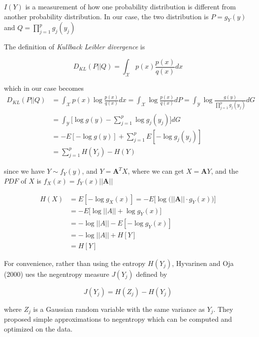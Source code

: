 \documentclass{article}
\begin{document}
\begin{tcolorbox}[title=\textit{Kullback  Leibler divergence}, coltitle = blue!50!black, colframe = blue!25]
	$I(Y)$ is a measurement of how one probability distribution is different from another probability distribution. In our case, the two distribution is $P = g_Y(y)$ and $Q = \prod_{j=1}^p g_j(y_j)$
	
	The definition of \textit{Kullback  Leibler divergence} is

	\begin{equation}
		D_{KL}(P||Q) = \int_{\mathcal X} p(x) \frac{p(x)}{q(x)} dx
	\end{equation}
	
	which in our case becomes
	\begin{align}
		D_{KL}(P||Q) &= \int_{\mathcal X} p(x) \log \frac{p(x)}{q(x)} dx
		 = \int_{\mathcal X} \log \frac{p(x)}{q(x)} dP
		  = \int_{\mathcal Y} \log \frac{g(y)}{\prod_{j=1}^p g_j(y_j)} dG\\
		& = \int_{\mathcal Y} \bigg[ \log g(y) - \sum_{j=1}^p \log g_j(y_j) \bigg] dG\\
		 &= -E[-\log g(y)] + \sum_{j=1}^p E[-\log g_j(y_j)]\\
		 & = \sum_{j=1}^p H(Y_j) - H(Y)
	\end{align}
	
\end{tcolorbox}


since we have $Y \sim f_Y(y)$, and $Y = \pmb A^T X$, where we can get $X = \pmb A Y$, and the $PDF$ of $X$ is $f_X(x) = f_Y(x)||\pmb A||$

\begin{align}
	H(X) & = E[-\log g_X(x)] = -E\bigg[ \log \big(||\pmb A|| \cdot g_Y(x)\big) \bigg]\\
	& = - E\bigg[ \log ||A|| + \log g_Y(x) \bigg] \\
	& = -\log||A|| - E[-\log g_Y(x)]\\
	& = -\log||A|| + H[Y]\\
	& = H[Y]
\end{align}



For convenience, rather than using the entropy $H(Y_j)$, Hyvarinen and Oja (2000) ues the negentropy measure $J(Y_j)$ defined by
\vspace{1.8mm}

\begin{equation}
	J(Y_j) = H(Z_j) - H(Y_j)
\end{equation}

where $Z_j$ is a Gaussian random variable with the same variance as $Y_j$. They proposed simple approximations to negentropy which can be computed and optimized on the data.
\end{document}

